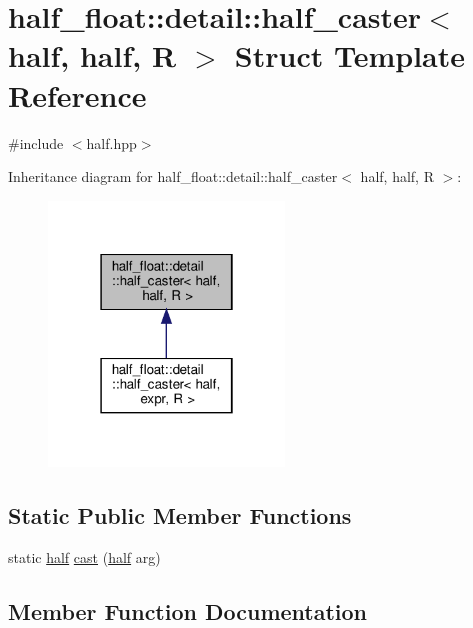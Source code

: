 \hypertarget{structhalf__float_1_1detail_1_1half__caster_3_01half_00_01half_00_01R_01_4}{}\section{half\+\_\+float\+:\+:detail\+:\+:half\+\_\+caster$<$ half, half, R $>$ Struct Template Reference}
\label{structhalf__float_1_1detail_1_1half__caster_3_01half_00_01half_00_01R_01_4}


{\ttfamily \#include $<$half.\+hpp$>$}



Inheritance diagram for half\+\_\+float\+:\+:detail\+:\+:half\+\_\+caster$<$ half, half, R $>$\+:
\nopagebreak
\begin{figure}[H]
\begin{center}
\leavevmode
\includegraphics[width=178pt]{structhalf__float_1_1detail_1_1half__caster_3_01half_00_01half_00_01R_01_4__inherit__graph}
\end{center}
\end{figure}
\subsection*{Static Public Member Functions}
\begin{DoxyCompactItemize}
\item 
static \hyperlink{classhalf__float_1_1half}{half} \hyperlink{structhalf__float_1_1detail_1_1half__caster_3_01half_00_01half_00_01R_01_4_afaaa63731da3198dc70a01cd784ac078}{cast} (\hyperlink{classhalf__float_1_1half}{half} arg)
\end{DoxyCompactItemize}


\subsection{Member Function Documentation}
\mbox{\label{structhalf__float_1_1detail_1_1half__caster_3_01half_00_01half_00_01R_01_4_afaaa63731da3198dc70a01cd784ac078}} 
